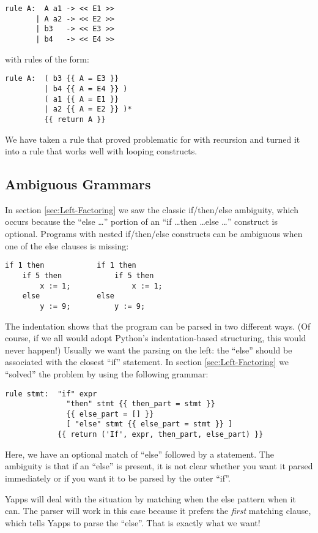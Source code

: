 \documentclass[10pt]{article}
\newcommand{\mysubsection}[1]{\subsection{#1}}
\begin{document}
\begin{verbatim}
rule A:  A a1 -> << E1 >> 
       | A a2 -> << E2 >>
       | b3   -> << E3 >>
       | b4   -> << E4 >>
\end{verbatim}

with rules of the form:

\begin{verbatim}
rule A:  ( b3 {{ A = E3 }} 
         | b4 {{ A = E4 }} )
         ( a1 {{ A = E1 }}
         | a2 {{ A = E2 }} )*
         {{ return A }}
\end{verbatim}

We have taken a rule that proved problematic for with recursion and
turned it into a rule that works well with looping constructs.

\mysubsection{Ambiguous Grammars}
\label{sec:Ambiguous-Grammars}

In section \ref{sec:Left-Factoring} we saw the classic if/then/else
ambiguity, which occurs because the ``else \ldots'' portion of an ``if
\ldots then \ldots else \ldots'' construct is optional.  Programs with 
nested if/then/else constructs can be ambiguous when one of the else
clauses is missing:
\begin{verbatim}
if 1 then            if 1 then
    if 5 then            if 5 then
        x := 1;              x := 1;
    else             else
        y := 9;          y := 9;
\end{verbatim}

The indentation shows that the program can be parsed in two different
ways.  (Of course, if we all would adopt Python's indentation-based
structuring, this would never happen!)  Usually we want the parsing on
the left: the ``else'' should be associated with the closest ``if''
statement.  In section \ref{sec:Left-Factoring} we ``solved'' the
problem by using the following grammar:

\begin{verbatim}
rule stmt:  "if" expr 
              "then" stmt {{ then_part = stmt }}
              {{ else_part = [] }}
              [ "else" stmt {{ else_part = stmt }} ]
            {{ return ('If', expr, then_part, else_part) }}
\end{verbatim}

Here, we have an optional match of ``else'' followed by a statement.
The ambiguity is that if an ``else'' is present, it is not clear
whether you want it parsed immediately or if you want it to be parsed
by the outer ``if''.

Yapps will deal with the situation by matching when the else pattern
when it can.  The parser will work in this case because it prefers the
\emph{first} matching clause, which tells Yapps to parse the ``else''.
That is exactly what we want!
\end{document}
